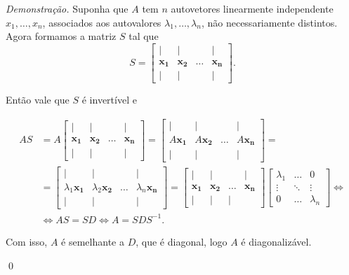 \documentclass[a4paper, 12pt]{article}
\theoremstyle{definition}
\newenvironment{demonstracao}{\noindent\textit{Demonstração.}}{\qed}
\theoremstyle{remark}
\begin{document}
\begin{demonstracao}
    Suponha que $A$ tem $n$ autovetores linearmente independente $x_1, \ldots, x_n$, associados aos autovalores $\lambda_1, \ldots, \lambda_n$, não necessariamente distintos. Agora formamos a matriz $S$ tal que
    $$S =
    \begin{bmatrix}
    \vert & \vert & \  & \vert \\
    \mathbf{x_1} & \mathbf{x_2} & \dots & \mathbf{x_n} \\
    \vert & \vert & \ & \vert
\end{bmatrix}.$$

Então vale que $S$ é invertível e

\begin{align*}
AS &= A
\begin{bmatrix}
    \vert & \vert & \  & \vert \\
    \mathbf{x_1} & \mathbf{x_2} & \dots & \mathbf{x_n} \\
    \vert & \vert & \ & \vert
\end{bmatrix}
=
\begin{bmatrix}
    \vert & \vert & \  & \vert \\
    A\mathbf{x_1} & A\mathbf{x_2} & \dots & A\mathbf{x_n} \\
    \vert & \vert & \ & \vert
\end{bmatrix}
=\\
&=
\begin{bmatrix}
    \vert & \vert & \  & \vert \\
    \lambda_1 \mathbf{x_1} & \lambda_2 \mathbf{x_2} & \dots & \lambda_n \mathbf{x_n} \\
    \vert & \vert & \ & \vert
\end{bmatrix}
=
\begin{bmatrix}
    \vert & \vert & \  & \vert \\
    \mathbf{x_1} & \mathbf{x_2} & \dots & \mathbf{x_n} \\
    \vert & \vert & \vert
\end{bmatrix}
\begin{bmatrix}
    \lambda_1 & \dots  & 0\\
    \vdots & \ddots & \vdots\\
    0 & \dots & \lambda_n
\end{bmatrix}
\Leftrightarrow\\
&\Leftrightarrow AS = SD \Leftrightarrow A = SDS^{-1}.
\end{align*}

Com isso, $A$ é semelhante a $D$, que é diagonal, logo $A$ é diagonalizável.

\end{demonstracao}
\end{document}

